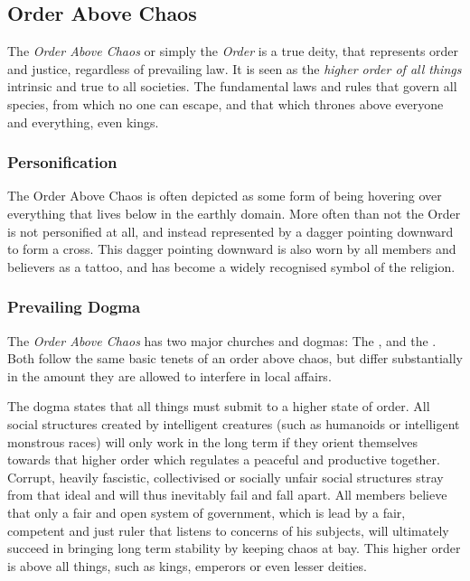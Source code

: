 \subsection{Order Above Chaos}
\label{sec:Order}

The \emph{Order Above Chaos} or simply the \emph{Order} is a true deity, that
represents order and justice, regardless of prevailing law. It is seen as the
\emph{higher order of all things} intrinsic and true to all societies. The
fundamental laws and rules that govern all species, from which no one can
escape, and that which thrones above everyone and everything, even kings.

\subsubsection{Personification}

The Order Above Chaos is often depicted as some form of being hovering over
everything that lives below in the earthly domain. More often than not the
Order is not personified at all, and instead represented by a dagger pointing
downward to form a cross. This dagger pointing downward is also worn by all
members and believers as a tattoo, and has become a widely recognised symbol
of the religion.

\subsubsection{Prevailing Dogma}

The \emph{Order Above Chaos} has two major churches and dogmas: The
, and the .
Both follow the same basic tenets of an order above chaos, but differ
substantially in the amount they are allowed to interfere in local affairs.

The dogma states that all things must submit to a higher state of order. All
social structures created by intelligent creatures (such as humanoids or
intelligent monstrous races) will only work in the long term if they orient
themselves towards that higher order which regulates a peaceful and productive
together. Corrupt, heavily fascistic, collectivised or socially unfair social
structures stray from that ideal and will thus inevitably fail and fall
apart. All members believe that only a fair and open system of government, which
is lead by a fair, competent and just ruler that listens to concerns of his
subjects, will ultimately succeed in bringing long term stability by keeping
chaos at bay. This higher order is above all things, such as kings, emperors
or even lesser deities.

